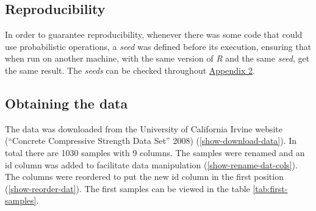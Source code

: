 \documentclass[
]{article}
\begin{document}
\hypertarget{reproducibility}{%
\subsection{Reproducibility}\label{reproducibility}}

In order to guarantee reproducibility, whenever there was some code that
could use probabilistic operations, a \emph{seed} was defined before its
execution, ensuring that when run on another machine, with the same
version of \emph{R} and the same \emph{seed}, get the same result. The
\emph{seeds} can be checked throughout
\protect\hyperlink{appendix2}{Appendix 2}.

\hypertarget{obtaining-the-data}{%
\subsection{Obtaining the data}\label{obtaining-the-data}}

The data was downloaded from the University of California Irvine website
(``Concrete Compressive Strength Data Set'' 2008)
(\ref{show-download-data}). In total there are 1030 samples with 9
columns. The samples were renamed and an id column was added to
facilitate data manipulation (\ref{show-rename-dat-cols}). The columns
were reordered to put the new id column in the first position
(\ref{show-reorder-dat}). The first samples can be viewed in the table
\ref{tab:first-samples}.

~

\begin{table}[H]

\caption{\label{tab:first-samples}First 6 samples}
\centering
{}
\end{table}
\end{document}
